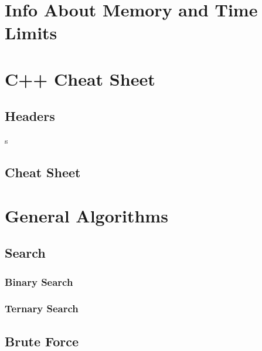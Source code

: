 \documentclass[10pt,landscape,twocolumn,notitlepage]{article}
\makeatletter
\let\org@subfile%
\renewcommand*{}[1]{%
    \filename@parse{#1}%
    \expandafter
    \graphicspath\expandafter{\expandafter{\filename@area}}%
    \expandafter
    \lstset\expandafter{inputpath={\expandafter\filename@area}}%
    \org@subfile{#1}
    \lstset{inputpath=\currfiledir}%
}
\makeatother
\begin{document}
\def\title{Nicholas Mc-Donnell's ICPC Notes}
\tableofcontents\newpage

\section{Info About Memory and Time Limits}


\section{C++ Cheat Sheet}
\subsection{Headers}s


\subsection{Cheat Sheet}



\section{General Algorithms}
\subsection{Search}
\subsubsection{Binary Search}


\subsubsection{Ternary Search}


\subsection{Brute Force}












\end{document}
